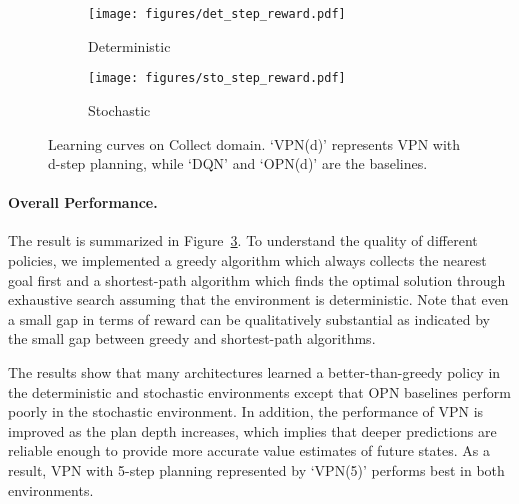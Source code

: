 \documentclass{article}
\newcommand{\cutparagraphup}{\vspace{-2pt}}
\begin{document}
\begin{figure}
\centering
	\begin{subfigure}{0.36\linewidth}
    		\centering
	    \texttt{[image: figures/det\_step\_reward.pdf]} 
	    \vspace{-15pt}
	    \caption{Deterministic}
	    \label{fig:curve-det}
   	\end{subfigure}
   	\begin{subfigure}{0.36\linewidth}
    		\centering
	    \texttt{[image: figures/sto\_step\_reward.pdf]} 
	    \vspace{-15pt}
	    \caption{Stochastic}
	    \label{fig:curve-sto}
   	\end{subfigure}
	\begin{subfigure}{0.14\linewidth}
    		\centering
   	\end{subfigure}
   	\vspace{-5pt}
	\caption{Learning curves on Collect domain. `VPN(d)' represents VPN with d-step planning, while `DQN' and `OPN(d)' are the baselines. } 
	\vspace{-15pt}
	\label{fig:curves}
\end{figure}

\cutparagraphup
\paragraph{Overall Performance.} 
The result is summarized in Figure~\ref{fig:curves}. To understand the quality of different policies, we implemented a greedy algorithm which always collects the nearest goal first and a shortest-path algorithm which finds the optimal solution through exhaustive search assuming that the environment is deterministic. Note that even a small gap in terms of reward can be qualitatively substantial as indicated by the small gap between greedy and shortest-path algorithms. 

The results show that many architectures learned a better-than-greedy policy in the deterministic and stochastic environments except that OPN baselines perform poorly in the stochastic environment. 
In addition, the performance of VPN is improved as the plan depth increases, which implies that deeper predictions are reliable enough to provide more accurate value estimates of future states. As a result, VPN with 5-step planning represented by `VPN(5)' performs best in both environments.
\end{document}
